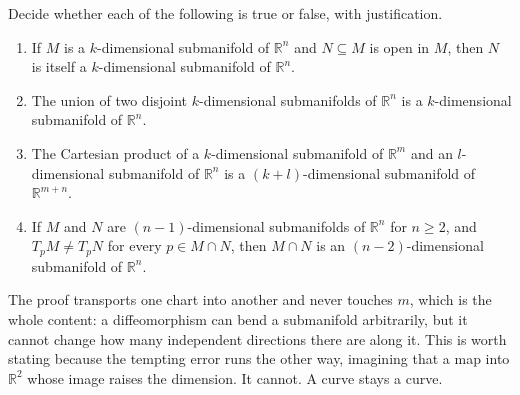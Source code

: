 \begin{exercise}
\label{ex:operations_preserving_submanifolds}
Decide whether each of the following is true or false, with justification.
\begin{enumerate}[label=\textbf{(\alph*)}]
  \item If $M$ is a $k$-dimensional submanifold of $\mathbb{R}^n$ and $N \subseteq M$ is open in
    $M$, then $N$ is itself a $k$-dimensional submanifold of $\mathbb{R}^n$.
  \item The union of two disjoint $k$-dimensional submanifolds of $\mathbb{R}^n$ is a
    $k$-dimensional submanifold of $\mathbb{R}^n$.
  \item The Cartesian product of a $k$-dimensional submanifold of $\mathbb{R}^m$ and an
    $l$-dimensional submanifold of $\mathbb{R}^n$ is a $(k+l)$-dimensional submanifold of
    $\mathbb{R}^{m+n}$.
  \item If $M$ and $N$ are $(n-1)$-dimensional submanifolds of $\mathbb{R}^n$ for $n \geq 2$, and
    $T_pM \neq T_pN$ for every $p \in M \cap N$, then $M \cap N$ is an $(n-2)$-dimensional
    submanifold of $\mathbb{R}^n$.
\end{enumerate}
\end{exercise}

\begin{remark}
\label{rem:dimension_is_a_diffeomorphism_invariant}
The proof transports one chart into another and never touches $m$, which is the whole content: a
diffeomorphism can bend a submanifold arbitrarily, but it cannot change how many independent
directions there are along it. This is worth stating because the tempting error runs the other
way, imagining that a map into $\mathbb{R}^2$ whose image  raises the dimension.
It cannot. A curve stays a curve.
\end{remark}

